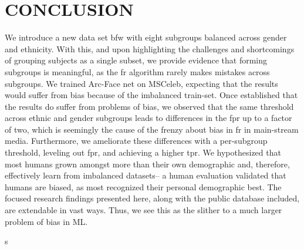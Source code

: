 \documentclass[a4paper, 10pt, conference]{ieeeconf}      %
\begin{document}
\begin{table}[t!]
\begin{center}
    \caption{\small{\textbf{Quantitative of human assessment.} Different human subgroups listed per row. Each column is the subgroup labeled. Note that each people are best within their subgroup, and second-best within the same subgroup but different gender. CF shows the least variation, but with the lowest accuracy. CM shows the best accuracy, but second to \gls{wm} in deviation from the mean. Thus, scores for males vary more than females.}}
    \label{tab:humsn-eval-results} 
     \vspace{-2mm}

\footnotesize
{}
 \end{center}
 \vspace{-6mm}
\end{table} 

\glsresetall
\section{CONCLUSION}
We introduce a new data set \gls{bfw} with eight subgroups balanced across gender and ethnicity. With this, and upon highlighting the challenges and shortcomings of grouping subjects as a single subset, we provide evidence that forming subgroups is meaningful, as the \gls{fr} algorithm rarely makes mistakes across subgroups. We trained Arc-Face net on MSCeleb, expecting that the results would suffer from bias because of the imbalanced train-set. Once established that the results do suffer from problems of bias, we observed that the same threshold across ethnic and gender subgroups leads to differences in the \gls{fpr} up to a factor of two, which is seemingly the cause of the frenzy about bias in \gls{fr} in main-stream media. Furthermore, we ameliorate these differences with a per-subgroup threshold, leveling out \gls{fpr}, and achieving a higher \gls{tpr}. We hypothesized that most humans grown amongst more than their own demographic and, therefore, effectively learn from imbalanced datasets-- a human evaluation validated that humans are biased, as most recognized their personal demographic best. The focused research findings presented here, along with the public database included, are extendable in vast ways. Thus, we see this as the slither to a much larger problem of bias in ML.

s


%
\end{document}
